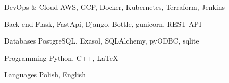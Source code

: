 

\begin{cvskills}

  \cvskill
    {DevOps \& Cloud} %
    {AWS, GCP, Docker, Kubernetes, Terraform, Jenkins} %

  \cvskill
    {Back-end} %
    {Flask, FastApi, Django, Bottle, gunicorn, REST API} %

  \cvskill
    {Databases} %
    {PostgreSQL, Exasol, SQLAlchemy, pyODBC, sqlite} %

  \cvskill
    {Programming} %
    {Python, C++, \LaTeX\;} %

  \cvskill
    {Languages} %
    {Polish, English} %

\end{cvskills}
